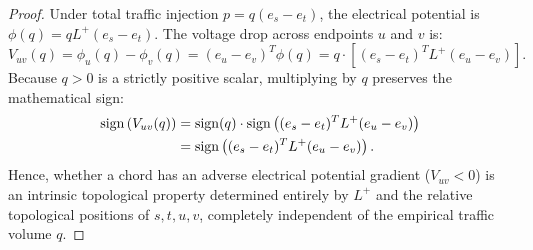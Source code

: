 \documentclass[11pt,a4paper]{article}
\begin{document}
\begin{proof}
Under total traffic injection $p = q (e_s - e_t)$, the electrical potential is $\phi(q) = q L^+ (e_s - e_t)$. The voltage drop across endpoints $u$ and $v$ is:
\begin{equation}
V_{uv}(q) = \phi_u(q) - \phi_v(q) = (e_u - e_v)^T \phi(q) = q \cdot \left[ (e_s - e_t)^T L^+ (e_u - e_v) \right].
\end{equation}
Because $q > 0$ is a strictly positive scalar, multiplying by $q$ preserves the mathematical sign:
\begin{align}
\operatorname{sign}\left( V_{uv}(q) \right) &= \operatorname{sign}(q) \cdot \operatorname{sign}\left( (e_s - e_t)^T L^+ (e_u - e_v) \right) \notag \\
&= \operatorname{sign}\left( (e_s - e_t)^T L^+ (e_u - e_v) \right).
\end{align}
Hence, whether a chord has an adverse electrical potential gradient ($V_{uv} < 0$) is an intrinsic topological property determined entirely by $L^+$ and the relative topological positions of $s, t, u, v$, completely independent of the empirical traffic volume $q$.
\end{proof}
\end{document}
